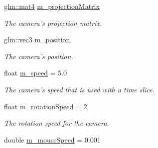 \begin{CompactItemize}
\item 
\hypertarget{class_camera_26d7567bf34d14260f887a0382aeae29}{
\hyperlink{group__core__types_g7dcd2365c2e368e6af5b7adeb6a9c8df}{glm::mat4} \hyperlink{class_camera_26d7567bf34d14260f887a0382aeae29}{m\_\-projectionMatrix}}
\label{class_camera_26d7567bf34d14260f887a0382aeae29}

\begin{CompactList}\small\item\em The camera's projection matrix. \item\end{CompactList}\item 
\hypertarget{class_camera_a4d06d49524248f81823444fa2544da0}{
\hyperlink{group__core__types_g1c47e8b3386109bc992b6c48e91b0be7}{glm::vec3} \hyperlink{class_camera_a4d06d49524248f81823444fa2544da0}{m\_\-position}}
\label{class_camera_a4d06d49524248f81823444fa2544da0}

\begin{CompactList}\small\item\em The camera's position. \item\end{CompactList}\item 
\hypertarget{class_camera_809774c9955a53755048ea80d934e912}{
float \hyperlink{class_camera_809774c9955a53755048ea80d934e912}{m\_\-speed} = 5.0}
\label{class_camera_809774c9955a53755048ea80d934e912}

\begin{CompactList}\small\item\em The camera's speed that is used with a time slice. \item\end{CompactList}\item 
\hypertarget{class_camera_0b1c75781c142e6bb28761224d0b67ce}{
float \hyperlink{class_camera_0b1c75781c142e6bb28761224d0b67ce}{m\_\-rotationSpeed} = 2}
\label{class_camera_0b1c75781c142e6bb28761224d0b67ce}

\begin{CompactList}\small\item\em The rotation speed for the camera. \item\end{CompactList}\item 
\hypertarget{class_camera_800e33ab274f130f97e5e51d821476ac}{
double \hyperlink{class_camera_800e33ab274f130f97e5e51d821476ac}{m\_\-mouseSpeed} = 0.001}
\label{class_camera_800e33ab274f130f97e5e51d821476ac}


\end{CompactItemize}
